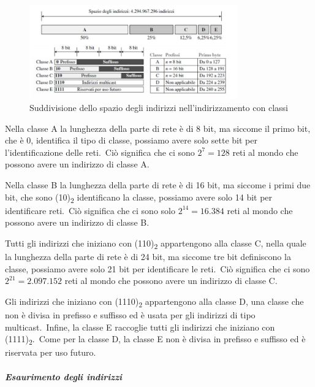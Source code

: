 \begin{figure}[H]
    \centering
    \includegraphics[width = 0.8\textwidth]{immagini/ClassiIP.jpg}
    \caption*{Suddivisione dello spazio degli indirizzi nell'indirizzamento con classi}
\end{figure}

Nella classe A la lunghezza della parte di rete è di 8 bit, ma siccome il primo bit, che è 0, identifica il tipo di classe, possiamo avere solo sette bit per l'identificazione delle reti.\
Ciò significa che ci sono $2^7=128$ reti al mondo che possono avere un indirizzo di classe A.

Nella classe B la lunghezza della parte di rete è di 16 bit, ma siccome i primi due bit, che sono (10)\textsubscript{2} identificano la classe, possiamo avere solo 14 bit per identificare reti.\
Ciò significa che ci sono solo $2^{14} = 16.384$ reti al mondo che possono avere un indirizzo di classe B.

Tutti gli indirizzi che iniziano con (110)\textsubscript{2} appartengono alla classe C, nella quale la lunghezza della parte di rete è di 24 bit, ma siccome tre bit definiscono la classe, possiamo avere solo 21 bit per identificare le reti.\
Ciò significa che ci sono $2^{21}=2.097.152$ reti al mondo che possono avere un indirizzo di classe C.

Gli indirizzi che iniziano con (1110)\textsubscript{2} appartengono alla classe D, una classe che non è divisa in prefisso e suffisso ed è usata per gli indirizzi di tipo multicast.\
Infine, la classe E raccoglie tutti gli indirizzi che iniziano con (1111)\textsubscript{2}.\
Come per la classe D, la classe E non è divisa in prefisso e suffisso ed è riservata per uso futuro.

\paragraph{\emph{Esaurimento degli indirizzi}}

